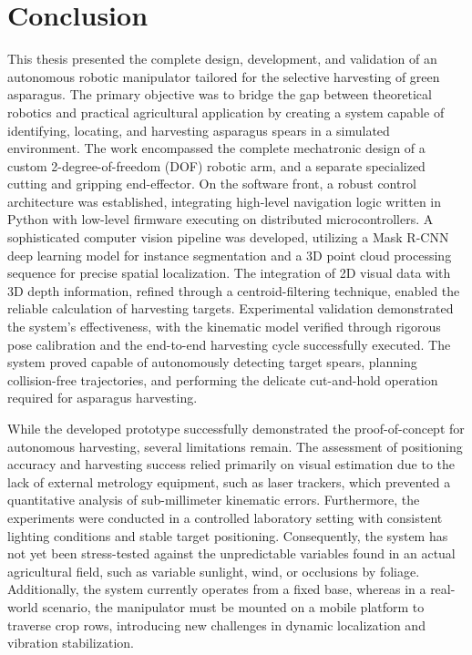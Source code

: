 \chapter{Conclusion}

This thesis presented the complete design, development, and validation of an autonomous robotic 
manipulator tailored for the selective harvesting of green asparagus. The primary objective was 
to bridge the gap between theoretical robotics and practical agricultural application by 
creating a system capable of identifying, locating, and harvesting asparagus spears in a 
simulated environment. The work encompassed the complete mechatronic design of a custom 
2-degree-of-freedom (DOF) robotic arm, and a separate specialized cutting and gripping 
end-effector. On the software front, a robust control architecture was established, 
integrating high-level navigation logic written in Python with low-level firmware executing 
on distributed microcontrollers. A sophisticated computer vision pipeline was developed, 
utilizing a Mask R-CNN deep learning model for instance segmentation and a 3D point cloud 
processing sequence for precise spatial localization. The integration of 2D visual data with 
3D depth information, refined through a centroid-filtering technique, enabled the reliable 
calculation of harvesting targets. Experimental validation demonstrated the system's 
effectiveness, with the kinematic model verified through rigorous pose calibration and the 
end-to-end harvesting cycle successfully executed. The system proved capable of autonomously 
detecting target spears, planning collision-free trajectories, and performing the delicate 
cut-and-hold operation required for asparagus harvesting.

While the developed prototype successfully demonstrated the proof-of-concept for autonomous 
harvesting, several limitations remain. The assessment of positioning accuracy and harvesting 
success relied primarily on visual estimation due to the lack of external metrology equipment, 
such as laser trackers, which prevented a quantitative analysis of sub-millimeter kinematic 
errors. Furthermore, the experiments were conducted in a controlled laboratory setting with 
consistent lighting conditions and stable target positioning. Consequently, the system has 
not yet been stress-tested against the unpredictable variables found in an actual agricultural 
field, such as variable sunlight, wind, or occlusions by foliage. Additionally, the system 
currently operates from a fixed base, whereas in a real-world scenario, the manipulator must 
be mounted on a mobile platform to traverse crop rows, introducing new challenges in dynamic 
localization and vibration stabilization.

